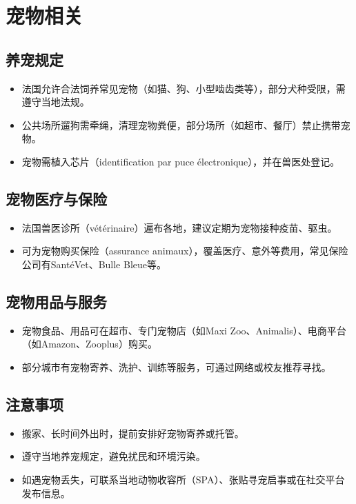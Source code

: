 \section{宠物相关}

\subsection{养宠规定}
\begin{itemize}
    \item 法国允许合法饲养常见宠物（如猫、狗、小型啮齿类等），部分犬种受限，需遵守当地法规。
    \item 公共场所遛狗需牵绳，清理宠物粪便，部分场所（如超市、餐厅）禁止携带宠物。
    \item 宠物需植入芯片（identification par puce électronique），并在兽医处登记。
\end{itemize}

\subsection{宠物医疗与保险}
\begin{itemize}
    \item 法国兽医诊所（vétérinaire）遍布各地，建议定期为宠物接种疫苗、驱虫。
    \item 可为宠物购买保险（assurance animaux），覆盖医疗、意外等费用，常见保险公司有SantéVet、Bulle Bleue等。
\end{itemize}

\subsection{宠物用品与服务}
\begin{itemize}
    \item 宠物食品、用品可在超市、专门宠物店（如Maxi Zoo、Animalis）、电商平台（如Amazon、Zooplus）购买。
    \item 部分城市有宠物寄养、洗护、训练等服务，可通过网络或校友推荐寻找。
\end{itemize}

\subsection{注意事项}
\begin{itemize}
    \item 搬家、长时间外出时，提前安排好宠物寄养或托管。
    \item 遵守当地养宠规定，避免扰民和环境污染。
    \item 如遇宠物丢失，可联系当地动物收容所（SPA）、张贴寻宠启事或在社交平台发布信息。
\end{itemize}
